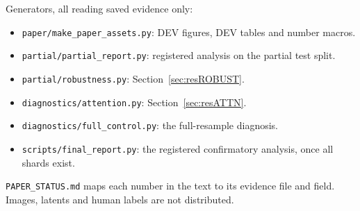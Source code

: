 Generators, all reading saved evidence only:
\begin{itemize}
\item \texttt{paper/make\_paper\_assets.py}: DEV figures, DEV tables and number macros.
\item \texttt{partial/partial\_report.py}: registered analysis on the partial test split.
\item \texttt{partial/robustness.py}: Section~\ref{sec:resROBUST}.
\item \texttt{diagnostics/attention.py}: Section~\ref{sec:resATTN}.
\item \texttt{diagnostics/full\_control.py}: the full-resample diagnosis.
\item \texttt{scripts/final\_report.py}: the registered confirmatory analysis, once all shards exist.
\end{itemize}
\texttt{PAPER\_STATUS.md} maps each number in the text to its evidence file and field. Images, latents and human labels are not distributed.
